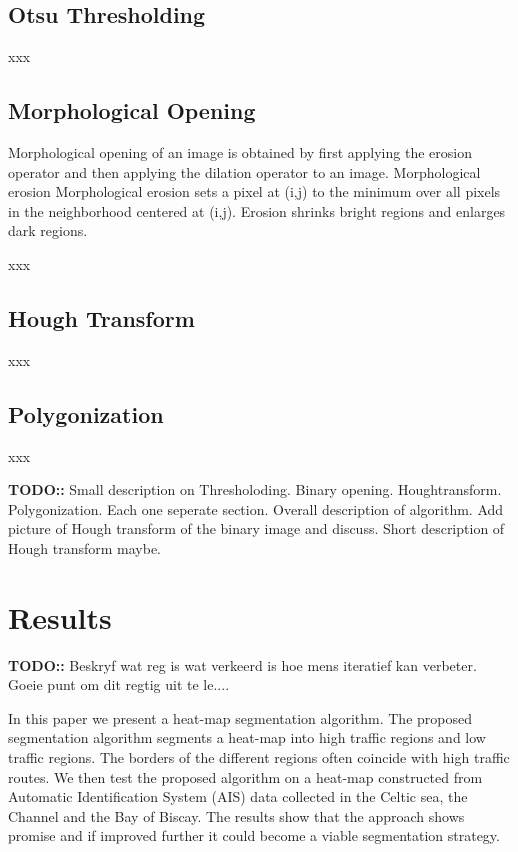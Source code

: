 \documentclass{article}
\begin{document}
\subsection{Otsu Thresholding}
xxx
\subsection{Morphological Opening}
Morphological opening of an image is obtained by first applying the erosion operator and then applying the dilation operator to an image. 
Morphological erosion 
Morphological erosion sets a pixel at (i,j) to the minimum over all pixels in the neighborhood centered at (i,j). Erosion shrinks bright regions and enlarges dark regions.

xxx
\subsection{Hough Transform}
xxx
\subsection{Polygonization}
xxx

 \textbf{TODO::} Small description on Thresholoding. Binary opening. Houghtransform. Polygonization. Each one seperate section. Overall description of algorithm. Add picture of Hough 
 transform of the binary image and discuss. Short description of Hough transform maybe. 
 
 
 
 \section{Results}
 \textbf{TODO::} Beskryf wat reg is wat verkeerd is hoe mens iteratief kan verbeter. Goeie punt om dit regtig uit te le....
 
 
In this paper we present a heat-map segmentation algorithm. The proposed segmentation algorithm
segments a heat-map into high traffic regions and low traffic regions. The borders of the different regions often coincide with high traffic routes. We then test the proposed 
algorithm on a heat-map constructed from Automatic Identification System (AIS) data collected in the Celtic sea, the Channel and the Bay of Biscay. The results show that the approach shows promise and if improved further 
it could become a viable segmentation strategy.
 
\end{document}
